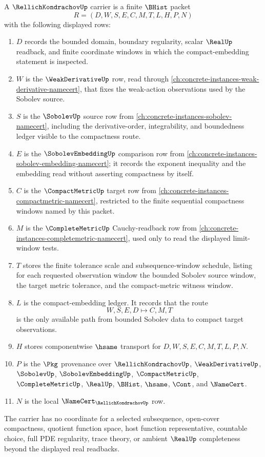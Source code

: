 \begin{definition}
\label{def:rellich-kondrachov-carrier}
A $\RellichKondrachovUp$ carrier is a finite $\BHist$ packet
$$
R=(D,W,S,E,C,M,T,L,H,P,N)
$$
with the following displayed rows:
\begin{enumerate}
\item $D$ records the bounded domain, boundary regularity, scalar $\RealUp$ readback, and finite coordinate windows in which the compact-embedding statement is inspected.
\item $W$ is the $\WeakDerivativeUp$ row, read through \autoref{ch:concrete-instances-weak-derivative-namecert}, that fixes the weak-action observations used by the Sobolev source.
\item $S$ is the $\SobolevUp$ source row from \autoref{ch:concrete-instances-sobolev-namecert}, including the derivative-order, integrability, and boundedness ledger visible to the compactness route.
\item $E$ is the $\SobolevEmbeddingUp$ comparison row from \autoref{ch:concrete-instances-sobolev-embedding-namecert}; it records the exponent inequality and the embedding read without asserting compactness by itself.
\item $C$ is the $\CompactMetricUp$ target row from \autoref{ch:concrete-instances-compactmetric-namecert}, restricted to the finite sequential compactness windows named by this packet.
\item $M$ is the $\CompleteMetricUp$ Cauchy-readback row from \autoref{ch:concrete-instances-completemetric-namecert}, used only to read the displayed limit-window tests.
\item $T$ stores the finite tolerance scale and subsequence-window schedule, listing for each requested observation window the bounded Sobolev source window, the target metric tolerance, and the compact-metric witness window.
\item $L$ is the compact-embedding ledger. It records that the route
$$
W,S,E,D \longmapsto C,M,T
$$
is the only available path from bounded Sobolev data to compact target observations.
\item $H$ stores componentwise $\hsame$ transport for $D,W,S,E,C,M,T,L,P,N$.
\item $P$ is the $\Pkg$ provenance over $\RellichKondrachovUp$, $\WeakDerivativeUp$, $\SobolevUp$, $\SobolevEmbeddingUp$, $\CompactMetricUp$, $\CompleteMetricUp$, $\RealUp$, $\BHist$, $\hsame$, $\Cont$, and $\NameCert$.
\item $N$ is the local $\NameCert_{\RellichKondrachovUp}$ row.
\end{enumerate}
The carrier has no coordinate for a selected subsequence, open-cover compactness, quotient function space, host function representative, countable choice, full PDE regularity, trace theory, or ambient $\RealUp$ completeness beyond the displayed real readbacks.
\end{definition}

